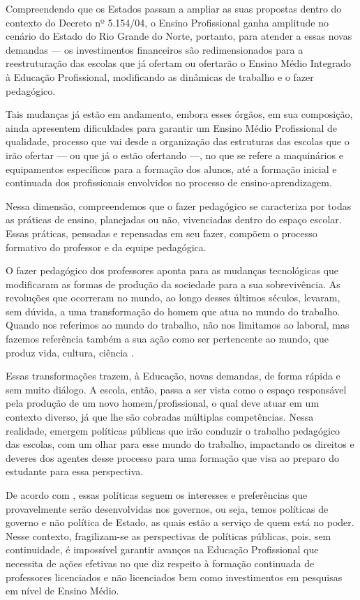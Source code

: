 \begin{refsection}
    Compreendendo que os Estados passam a ampliar as suas propostas dentro do contexto do Decreto nº 5.154/04, o Ensino Profissional ganha amplitude no cenário do Estado do Rio Grande do Norte, portanto, para atender a essas novas demandas --- os investimentos financeiros são redimensionados para a reestruturação das escolas que já ofertam ou ofertarão o Ensino Médio Integrado à Educação Profissional, modificando as dinâmicas de trabalho e o fazer pedagógico.  

    Tais mudanças já estão em andamento, embora esses órgãos, em sua composição, ainda apresentem dificuldades para garantir um Ensino Médio Profissional de qualidade, processo que vai desde a organização das estruturas das escolas que o irão ofertar --- ou que já o estão ofertando ---, no que se refere a maquinários e equipamentos específicos para a formação dos alunos, até a formação inicial e continuada dos profissionais envolvidos no processo de ensino-aprendizagem.  

    Nessa dimensão, compreendemos que o fazer pedagógico se caracteriza por todas as práticas de ensino, planejadas ou não, vivenciadas dentro do espaço escolar. Essas práticas, pensadas e repensadas em seu fazer, compõem o processo formativo do professor e da equipe pedagógica. 

    O fazer pedagógico dos professores aponta para as mudanças tecnológicas que modificaram as formas de produção da sociedade para a sua sobrevivência. As revoluções que ocorreram no mundo, ao longo desses últimos séculos, levaram, sem dúvida, a uma transformação do homem que atua no mundo do trabalho. Quando nos referimos ao mundo do trabalho, não nos limitamos ao laboral, mas fazemos referência também a sua ação como ser pertencente ao mundo, que produz vida, cultura, ciência \cite{CIAVATTA2005formação}.  

    Essas transformações trazem, à Educação, novas demandas, de forma rápida e sem muito diálogo. A escola, então, passa a ser vista como o espaço responsável pela produção de um novo homem/profissional, o qual deve atuar em um contexto diverso, já que lhe são cobradas múltiplas competências. Nessa realidade, emergem políticas públicas que irão conduzir o trabalho pedagógico das escolas, com um olhar para esse mundo do trabalho, impactando os direitos e deveres dos agentes desse processo para uma formação que visa ao preparo do estudante para essa perspectiva. 

    De acordo com \textcite[p.~2]{NASCIMENTOAndSILVA2017Políticas}, essas políticas seguem os interesses e preferências que provavelmente serão desenvolvidas nos governos, ou seja, temos políticas de governo e não política de Estado, as quais estão a serviço de quem está no poder. Nesse contexto, fragilizam-se as perspectivas de políticas públicas, pois, sem continuidade, é impossível garantir avanços na Educação Profissional que necessita de ações efetivas no que diz respeito à formação continuada de professores licenciados e não licenciados bem como investimentos em pesquisas em nível de Ensino Médio.  


\end{refsection}
